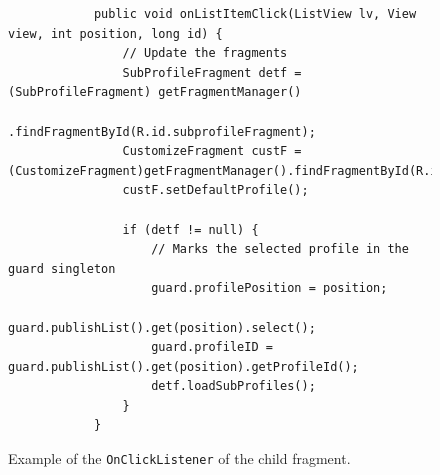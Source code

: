 \begin{figure}[H]%
		\begin{lstlisting}
			public void onListItemClick(ListView lv, View view, int position, long id) {
				// Update the fragments
				SubProfileFragment detf = (SubProfileFragment) getFragmentManager()
						.findFragmentById(R.id.subprofileFragment);
				CustomizeFragment custF = (CustomizeFragment)getFragmentManager().findFragmentById(R.id.customizeFragment);
				custF.setDefaultProfile();
				
				if (detf != null) {
					// Marks the selected profile in the guard singleton
					guard.profilePosition = position; 
					guard.publishList().get(position).select();
					guard.profileID = guard.publishList().get(position).getProfileId();
					detf.loadSubProfiles();
				}
			}
		\end{lstlisting}
	\caption{Example of the \texttt{OnClickListener} of the child fragment.}
	\label{code:listview_onclick_example}%
\end{figure}


